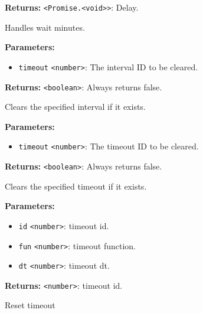\documentclass[12pt,a4paper]{article}
\begin{document}
\noindent \textbf{Returns:} \texttt{<Promise.<void>>}: Delay.

\noindent Handles wait minutes.

\vspace{5mm}
\noindent {}


\noindent \textbf{Parameters:}
\begin{itemize}
  \item \texttt{timeout} \texttt{<number>}: The interval ID to be cleared.
\end{itemize}

\noindent \textbf{Returns:} \texttt{<boolean>}: Always returns false.

\noindent Clears the specified interval if it exists.

\vspace{5mm}
\noindent {}


\noindent \textbf{Parameters:}
\begin{itemize}
  \item \texttt{timeout} \texttt{<number>}: The timeout ID to be cleared.
\end{itemize}

\noindent \textbf{Returns:} \texttt{<boolean>}: Always returns false.

\noindent Clears the specified timeout if it exists.

\vspace{5mm}
\noindent {}


\noindent \textbf{Parameters:}
\begin{itemize}
  \item \texttt{id} \texttt{<number>}: timeout id.
  \item \texttt{fun} \texttt{<number>}: timeout function.
  \item \texttt{dt} \texttt{<number>}: timeout dt.
\end{itemize}

\noindent \textbf{Returns:} \texttt{<number>}: timeout id.

\noindent Reset timeout
\end{document}
